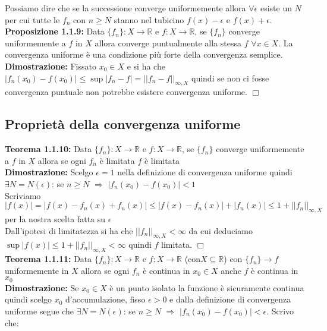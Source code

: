\documentclass[a4paper,11pt,titlepage]{book}
\begin{document}
Possiamo dire che se la successione converge uniformemente allora $\forall\epsilon$ esiste un $N$ per cui tutte le $f_n$ con $n\geq N$ stanno nel tubicino $f(x)-\epsilon$ e $f(x)+\epsilon$.\\

\textbf{Proposizione 1.1.9:} Data $\{f_{n}\}:X\rightarrow\mathbb{R}$ e $f:X\rightarrow\mathbb{R}$, se $\{f_{n}\}$ converge uniformemente a $f$ in $X$ allora converge puntualmente alla stessa $f$ $\forall x\in X$. La convergenza uniforme è una condizione più forte della convergenza semplice.\\

\textbf{Dimostrazione:} Fissato $x_0\in X$ e si ha che $|f_{n}(x_{0})-f(x_{0})|\leq \sup |f_{n}-f|=||f_{n}-f||_{\infty,X}$ quindi se non ci fosse convergenza puntuale non potrebbe esistere convergenza uniforme. $\Box$

\subsection{Proprietà della convergenza uniforme}

\textbf{Teorema 1.1.10:} Data $\{f_{n}\}:X\rightarrow\mathbb{R}$ e $f:X\rightarrow\mathbb{R}$, se $\{f_{n}\}$ converge uniformemente a $f$ in $X$ allora se ogni $f_{n}$ è limitata $f$ è limitata\\

\textbf{Dimostrazione:} Scelgo $\epsilon =1$ nella definizione di convergenza uniforme  quindi $\exists{N}=N(\epsilon)$: se $n\geq{N}$ $\Rightarrow$ $|f_{n}(x_{0})-f(x_{0})|<1$\\

Scriviamo $|f(x)|=|f(x)-f_{n}(x)+f_{n}(x)|\leq |f(x)-f_{n}(x)|+|f_{n}(x)|\leq 1+||f_{n}||_{\infty,X}$ per la nostra scelta fatta su $\epsilon$\\

Dall'ipotesi di limitatezza si ha che $||f_{n}||_{\infty,X}<\infty$ da cui deduciamo $\sup |f(x)|\leq 1+||f_{n}||_{\infty,X}<\infty$ quindi $f$ limitata. $\Box$ \\

\textbf{Teorema 1.1.11:} Data $\{f_{n}\}:X\rightarrow\mathbb{R}$ e $f:X\rightarrow\mathbb{R}$ (con$X\subseteq \mathbb{R}$) con $\{f_{n}\}\rightarrow f$ uniformemente in $X$ allora se ogni $f_{n}$ è continua in $x_0 \in X$ anche $f$ è continua in $x_0$\\

\textbf{Dimostrazione:} Se $x_0 \in X$ è un punto isolato la funzione è sicuramente continua quindi scelgo $x_0$ d'accumulazione, fisso $\epsilon >0$ e dalla definizione di convergenza uniforme segue che $\exists{N}=N(\epsilon)$: se $n\geq{N}$ $\Rightarrow$ $|f_{n}(x_{0})-f(x_{0})|<\epsilon$. Scrivo che:
\end{document}
